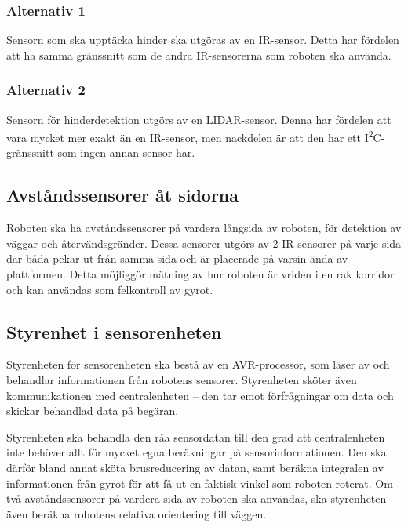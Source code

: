 \documentclass[a4paper,titlepage,12pt]{article}
\newcommand{\itc}{I\textsuperscript{2}C}
\begin{document}
	\subsubsection{Alternativ 1}

	Sensorn som ska upptäcka hinder ska utgöras av en IR-sensor. Detta
	har fördelen att ha samma gränssnitt som de andra IR-sensorerna som roboten
	ska använda.

	\subsubsection{Alternativ 2}

	Sensorn för hinderdetektion utgörs av en LIDAR-sensor. Denna har
	fördelen att vara mycket mer exakt än en IR-sensor, men nackdelen är att
	den har ett \itc{}-gränssnitt som ingen annan sensor har.

	\subsection{Avståndssensorer åt sidorna}
	Roboten ska ha avståndssensorer på vardera långsida av roboten, för
	detektion av väggar och återvändsgränder. Dessa sensorer utgörs av 2
    IR-sensorer på varje sida där båda pekar ut från samma sida och
	är placerade på varsin ända av plattformen. Detta möjliggör mätning av hur
	roboten är vriden i en rak korridor och kan användas som felkontroll av
	gyrot.

	\subsection{Styrenhet i sensorenheten}

	Styrenheten för sensorenheten ska bestå av en AVR-processor, som läser av och behandlar
	informationen från robotens sensorer. Styrenheten sköter även
	kommunikationen med centralenheten -- den tar emot förfrågningar om data och
	skickar behandlad data på begäran.

	Styrenheten ska behandla den råa sensordatan till den grad att
	centralenheten inte behöver allt för mycket egna beräkningar på
	sensorinformationen. Den ska därför bland annat sköta brusreducering av
	datan, samt beräkna integralen av informationen från gyrot för att få ut en
	faktisk vinkel som roboten roterat. Om två avståndssensorer på vardera sida
	av roboten ska användas, ska styrenheten även beräkna robotens relativa
	orientering till väggen.
	
	\newpage{}
\end{document}
